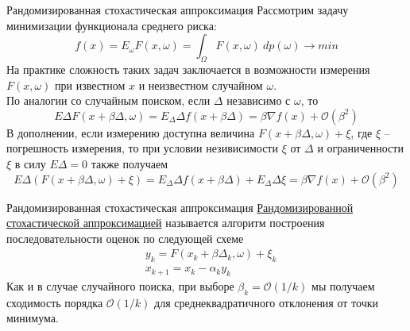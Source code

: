 \documentclass[10pt, handout]{beamer}
\begin{document}
\begin{frame}{Рандомизированная стохастическая аппроксимация}
Рассмотрим задачу минимизации функционала среднего риска:
$$
f(x)=E_\omega F(x, \omega)=\int_\Omega F(x, \omega)~dp(\omega)\rightarrow min
$$
\pause
На практике сложность таких задач заключается в возможности измерения $F(x, \omega)$ при известном $x$ и неизвестном случайном $\omega$.\\
\pause
\vspace{1em}
По аналогии со случайным поиском, если $\Delta$ независимо с $\omega$, то
$$
E\Delta F(x+\beta\Delta, \omega)=E_\Delta\Delta f(x+\beta\Delta) = \beta\nabla f(x)+\mathcal{O}(\beta^2)
$$
\pause
В дополнении, если измерению доступна величина $F(x+\beta\Delta, \omega)+\xi$, где $\xi$ -- погрешность измерения, то при условии незивисимости
$\xi$ от $\Delta$ и ограниченности $\xi$ в силу $E\Delta=0$ также получаем
$$
E\Delta (F(x+\beta\Delta, \omega)+\xi)=E_\Delta\Delta f(x+\beta\Delta)+E_\Delta\Delta\xi = \beta\nabla f(x)+\mathcal{O}(\beta^2)
$$

\end{frame}

\begin{frame}{Рандомизированная стохастическая аппроксимация}
\underline{Рандомизированной стохастической аппроксимацией} называется алгоритм построения последовательности оценок по следующей схеме
\begin{align}\label{rsa}
&y_k=F(x_k+\beta\Delta_k, \omega)+\xi_k \nonumber\\
&x_{k+1}=x_k-\alpha_k y_k
\end{align}
\pause 
Как и в случае случайного поиска, при выборе $\beta_k=\mathcal{O}(1/k)$ мы получаем сходимость порядка $\mathcal{O}(1/k)$ для среднеквадратичного отклонения
от точки минимума.
\end{frame}
\end{document}
